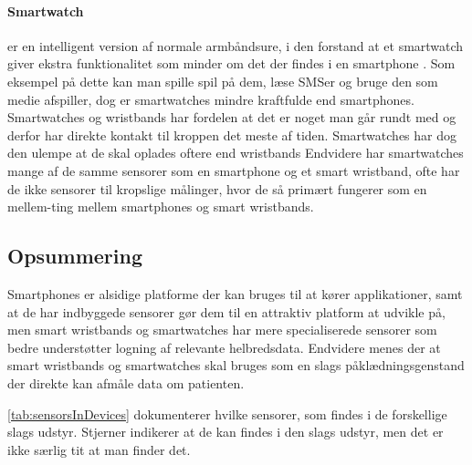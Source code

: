 \paragraph{Smartwatch}
 er en intelligent version af normale armbåndsure, i den forstand at et smartwatch giver ekstra funktionalitet som minder om det der findes i en smartphone \citep{msic:smartwatchstate}. 
Som eksempel på dette kan man spille spil på dem, læse SMSer og bruge den som medie afspiller, dog er smartwatches mindre kraftfulde end smartphones. 
Smartwatches og wristbands har fordelen at det er noget man går rundt med og derfor har direkte kontakt til kroppen det meste af tiden. Smartwatches har dog den ulempe at de skal oplades oftere end wristbands
Endvidere har smartwatches mange af de samme sensorer som en smartphone og et smart wristband, ofte har de ikke sensorer til kropslige målinger, hvor de så primært fungerer som en mellem-ting mellem smartphones og smart wristbands.

\subsection{Opsummering}
Smartphones er alsidige platforme der kan bruges til at kører applikationer, samt at de har indbyggede sensorer gør dem til en attraktiv platform at udvikle på, men smart wristbands og smartwatches har mere specialiserede sensorer som bedre understøtter logning af relevante helbredsdata.
Endvidere menes der at smart wristbands og smartwatches skal bruges som en slags påklædningsgenstand der direkte kan afmåle data om patienten.

\cref{tab:sensorsInDevices} dokumenterer hvilke sensorer, som findes i de forskellige slags udstyr. Stjerner indikerer at de kan findes i den slags udstyr, men det er ikke særlig tit at man finder det. %

